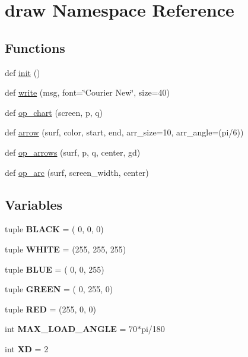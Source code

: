 \hypertarget{namespacedraw}{}\section{draw Namespace Reference}
\label{namespacedraw}
\subsection*{Functions}
\begin{DoxyCompactItemize}
\item 
def \hyperlink{namespacedraw_a8faeca448048936cb5bc781a47a0198a}{init} ()
\item 
def \hyperlink{namespacedraw_a92f4b47f502e75c973b88f1b2b8cc3fd}{write} (msg, font=\char`\"{}Courier New\char`\"{}, size=40)
\item 
def \hyperlink{namespacedraw_a43ef9e3a9bbc75b8eedb246bb405a440}{op\+\_\+chart} (screen, p, q)
\item 
def \hyperlink{namespacedraw_afd81ee7eb842130bdb8f43065d2df27a}{arrow} (surf, color, start, end, arr\+\_\+size=10, arr\+\_\+angle=(pi/6))
\item 
def \hyperlink{namespacedraw_a277cf79dca33663a9bcc173931660ac9}{op\+\_\+arrows} (surf, p, q, center, gd)
\item 
def \hyperlink{namespacedraw_af5dc748bd3063bc390fded916ae2a6d2}{op\+\_\+arc} (surf, screen\+\_\+width, center)
\end{DoxyCompactItemize}
\subsection*{Variables}
\begin{DoxyCompactItemize}
\item 
\mbox{\label{namespacedraw_a073753510e230b144b29e6bca4d6d10a}} 
tuple {\bfseries B\+L\+A\+CK} = ( 0, 0, 0)
\item 
\mbox{\label{namespacedraw_aef39b17a80c4d914408e430aa74d815e}} 
tuple {\bfseries W\+H\+I\+TE} = (255, 255, 255)
\item 
\mbox{\label{namespacedraw_a4dbb48a624bdc33477977841707271e8}} 
tuple {\bfseries B\+L\+UE} = ( 0, 0, 255)
\item 
\mbox{\label{namespacedraw_ad5f096bd59eb4bc2aa302076eaae8fcb}} 
tuple {\bfseries G\+R\+E\+EN} = ( 0, 255, 0)
\item 
\mbox{\label{namespacedraw_ae7bb3ea9d810a374eb499a62249838c1}} 
tuple {\bfseries R\+ED} = (255, 0, 0)
\item 
\mbox{\label{namespacedraw_af502731675c4fe43fb31566ee9f3859b}} 
int {\bfseries M\+A\+X\+\_\+\+L\+O\+A\+D\+\_\+\+A\+N\+G\+LE} = 70$\ast$pi/180
\item 
\mbox{\label{namespacedraw_a3d2bbe965a57a895106c9c09beaf8e70}} 
int {\bfseries XD} = 2
\end{DoxyCompactItemize}


